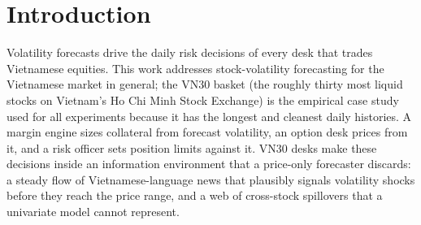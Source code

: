 \documentclass[runningheads]{llncs}
\begin{document}
\begin{abstract}
LSTM backbone the lowest at h1. Diebold--Mariano tests on the seed-ensembled predictions, run on the
QLIKE, squared-error, and absolute-error loss families, show no model favored across all three: relative
to HAR the full model shows no significant QLIKE difference at h1, h5, and h10 and significantly higher
QLIKE at h22, no significant squared-error difference at any horizon, and significantly lower absolute-error
loss at h5. The ablation removals are significant on some loss families and horizons and not others, so no
ablation verdict holds uniformly across the three losses and four horizons. Across all five metrics no
configuration consistently or significantly outperforms HAR. This paper's contribution is a leakage-safe
ablation-based attribution of a directed-spillover graph-attention news model against a strong HAR baseline
on sparse daily VN30 data.

\end{abstract}
%
\section{Introduction}
\label{sec:intro}
Volatility forecasts drive the daily risk decisions of every desk that trades Vietnamese equities. This
work addresses stock-volatility forecasting for the Vietnamese market in general; the VN30 basket (the
roughly thirty most liquid stocks on Vietnam's Ho Chi Minh Stock Exchange) is the empirical case study
used for all experiments because it has the longest and cleanest daily histories. A margin engine sizes
collateral from forecast volatility, an option desk prices from it, and a risk officer sets position limits
against it. VN30 desks make these decisions inside an information environment that a price-only forecaster
discards: a steady flow of Vietnamese-language news that plausibly signals volatility shocks before they
reach the price range, and a web of cross-stock spillovers that a univariate model cannot represent.
\end{document}
